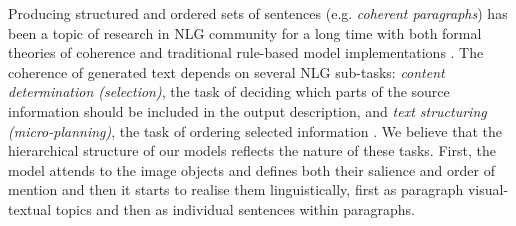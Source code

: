 \documentclass[11pt,a4paper]{article}
\newcommand{\kibitz}[2]{\ifnum\Comments=1\textcolor{#1}{#2}\fi}
\newcommand{\nikolai}[1]{\kibitz{red}   {[Nikolai: #1]}}
\begin{document}

Producing structured and ordered sets of sentences (e.g. \textit{coherent paragraphs}) has been a topic of research in NLG community for a long time with both formal theories of coherence \cite{grosz95,Barzilay2008} and traditional rule-based model implementations \cite{Reiter00buildingnatural,Deemter:2016aa}.
The coherence of generated text depends on several NLG sub-tasks: \textit{content determination (selection)}, the task of deciding which parts of the source information should be included in the output description, and \textit{text structuring (micro-planning)}, the task of ordering selected information \cite{Gatt2017}.
We believe that the hierarchical structure of our models reflects the nature of these tasks. First, the model attends to the image objects and defines both their salience and order of mention and then it starts to realise them linguistically, first as paragraph visual-textual topics and then as individual sentences within paragraphs.

\end{document}

